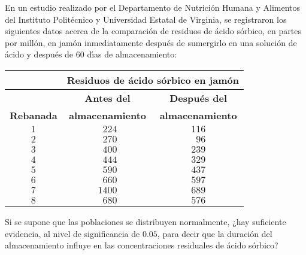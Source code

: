 \begin{enunciado}
 En un estudio realizado por el Departamento de Nutrici\'on Humana y Alimentos del Instituto Polit\'ecnico y Universidad Estatal de Virginia, se registraron los siguientes datos acerca de la comparaci\'on de residuos de \'acido s\'orbico, en partes por mill\'on, en jam\'on inmediatamente despu\'es de sumergirlo en una soluci\'on de \'acido y despu\'es de 60 d\'{\i}as de almacenamiento:
 \begin{center}
  \begin{tabular}{ccc}
   & \multicolumn{2}{c}{\textbf{Residuos de \'acido s\'orbico en jam\'on}} \\
   \hline 
   & \textbf{Antes del} & \textbf{Despu\'es del} \\
   \textbf{Rebanada} & \textbf{almacenamiento} & \textbf{almacenamiento} \\
   \hline 
   $1$ & $\phantom{1}224$ & $116$ \\
   $2$ & $\phantom{1}270$ & $\phantom{1}96$ \\
   $3$ & $\phantom{1}400$ & $239$ \\
   $4$ & $\phantom{1}444$ & $329$ \\
   $5$ & $\phantom{1}590$ & $437$ \\
   $6$ & $\phantom{1}660$ & $597$ \\
   $7$ & $1400$ & $689$ \\
   $8$ & $\phantom{1}680$ & $576$ \\
  \end{tabular}
 \end{center}
 Si se supone que las poblaciones se distribuyen normalmente, ¿hay suficiente evidencia, al nivel de significancia de $0.05$, para decir que la duraci\'on del almacenamiento influye en las concentraciones residuales de \'acido s\'orbico?
\end{enunciado}

